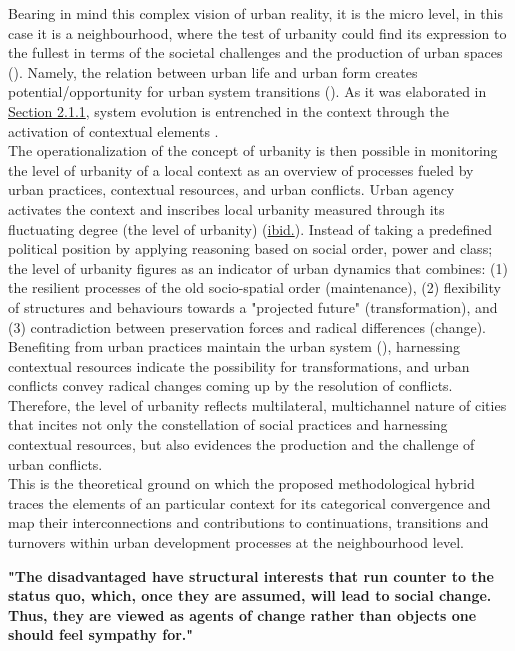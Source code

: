 \documentclass[11pt]{report}
\begin{document}
Bearing in mind this complex vision of urban reality, it is the micro level, in this case it is a neighbourhood, where the test of urbanity could find its expression to the fullest in terms of the societal challenges and the production of urban spaces (\cite{(Blotevogel et al. 2008)}).
Namely, the relation between urban life and urban form creates potential/opportunity for urban system transitions (\cite{(Marcus)}).
As it was elaborated in \href{Section 2.1.1}{Section 2.1.1}, system evolution is entrenched in the context through the activation of contextual elements .
\\

The operationalization of the concept of urbanity is then possible in monitoring the level of urbanity of a local context as an overview of processes fueled by urban practices, contextual resources, and urban conflicts.
Urban agency activates the context and inscribes local urbanity measured through its fluctuating degree (the level of urbanity) (\href{Marcus}{ibid.}).
Instead of taking a predefined political position by applying reasoning based on social order, power and class; the level of urbanity figures as an indicator of urban dynamics that combines:
(1) the resilient processes of the old socio-spatial order (maintenance),
(2) flexibility of structures and behaviours towards a "projected future" (transformation), and
(3) contradiction between preservation forces and radical differences (change).
Benefiting from urban practices maintain the urban system (\cite{(Tardin 2014)}), harnessing contextual resources indicate the possibility for transformations, and urban conflicts convey radical changes coming up by the resolution of conflicts.
Therefore, the level of urbanity reflects multilateral, multichannel  nature of cities that incites not only the constellation of social practices and harnessing contextual resources, but also evidences the production and the challenge of urban conflicts.
\\

This is the theoretical ground on which the proposed methodological hybrid traces the elements of an particular context for its categorical convergence and map their interconnections and contributions to continuations, transitions and turnovers within urban development processes at the neighbourhood level. 

\textbf{"The disadvantaged have structural interests that run counter to the status quo, which, once they are assumed, will lead to social change. Thus, they are viewed as agents of change rather than objects one should feel sympathy for." \citealt{Sears 2008}}
\end{document}
